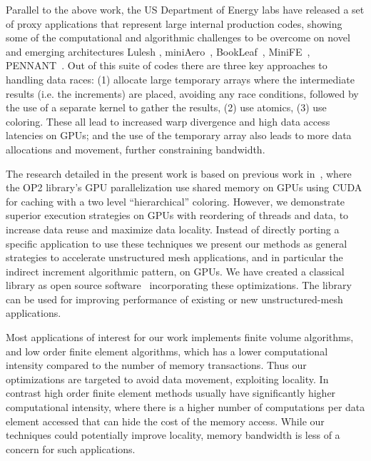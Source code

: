 Parallel to the above work, the US Department of Energy labs have released a 
set of proxy applications that represent large internal production codes,
showing some of the computational and algorithmic challenges to be overcome on 
novel and emerging architectures Lulesh \cite{LULESH2:changes}, 
miniAero~\cite{miniaero}, BookLeaf~\cite{bookleaf}, MiniFE~\cite{minife}, 
PENNANT~\cite{pennant}. Out of this suite of codes there are three key 
approaches to handling data races: (1) allocate large temporary arrays where 
the intermediate results (i.e. the increments) are placed, avoiding any race 
conditions, followed by the use of a separate kernel to gather the results, 
(2) use atomics, (3) use coloring. These all lead to increased warp divergence 
and high data access latencies on GPUs; and the use of the temporary array also 
leads to more data allocations and movement, further constraining bandwidth. 

The research detailed in the present work is based on previous work 
in~\cite{op2}, where the OP2 library's GPU parallelization use shared memory on 
GPUs using CUDA for caching with a two level ``hierarchical'' coloring. However, 
we demonstrate superior execution strategies on GPUs with reordering of threads 
and data, to increase data reuse and maximize data locality. Instead of directly 
porting a specific application to use these techniques we present our methods 
as general strategies to accelerate unstructured mesh applications, and in 
particular the indirect increment algorithmic pattern, on GPUs. We have 
created a classical library as open source software~\cite{opt-library} 
incorporating these optimizations. The library can be used for improving 
performance of existing or new unstructured-mesh applications.

Most applications of interest for our work implements finite volume algorithms, 
and low order finite element algorithms, which has a lower computational 
intensity compared to the number of memory transactions. Thus our optimizations 
are targeted to avoid data movement, exploiting locality. In contrast high 
order finite element methods usually have significantly higher computational 
intensity, where there is a higher number of computations per data element 
accessed that can hide the cost of the memory access. While our techniques could 
potentially improve locality, memory bandwidth is less of a concern for such 
applications.


